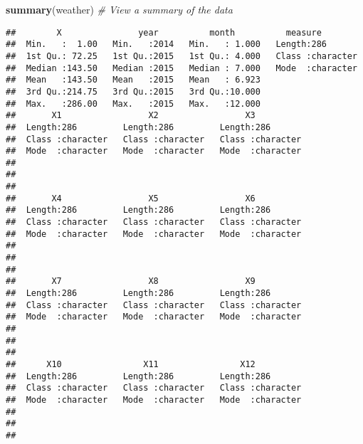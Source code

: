 \documentclass[]{article}
\newenvironment{Shaded}{\begin{snugshade}}{\end{snugshade}}
\newcommand{\KeywordTok}[1]{\textcolor[rgb]{0.13,0.29,0.53}{\textbf{#1}}}
\newcommand{\CommentTok}[1]{\textcolor[rgb]{0.56,0.35,0.01}{\textit{#1}}}
\newcommand{\NormalTok}[1]{#1}
\begin{document}
\begin{Shaded}
\begin{Highlighting}[]
\KeywordTok{summary}\NormalTok{(weather) }\CommentTok{# View a summary of the data}
\end{Highlighting}
\end{Shaded}

\begin{verbatim}
##        X               year          month          measure         
##  Min.   :  1.00   Min.   :2014   Min.   : 1.000   Length:286        
##  1st Qu.: 72.25   1st Qu.:2015   1st Qu.: 4.000   Class :character  
##  Median :143.50   Median :2015   Median : 7.000   Mode  :character  
##  Mean   :143.50   Mean   :2015   Mean   : 6.923                     
##  3rd Qu.:214.75   3rd Qu.:2015   3rd Qu.:10.000                     
##  Max.   :286.00   Max.   :2015   Max.   :12.000                     
##       X1                 X2                 X3           
##  Length:286         Length:286         Length:286        
##  Class :character   Class :character   Class :character  
##  Mode  :character   Mode  :character   Mode  :character  
##                                                          
##                                                          
##                                                          
##       X4                 X5                 X6           
##  Length:286         Length:286         Length:286        
##  Class :character   Class :character   Class :character  
##  Mode  :character   Mode  :character   Mode  :character  
##                                                          
##                                                          
##                                                          
##       X7                 X8                 X9           
##  Length:286         Length:286         Length:286        
##  Class :character   Class :character   Class :character  
##  Mode  :character   Mode  :character   Mode  :character  
##                                                          
##                                                          
##                                                          
##      X10                X11                X12           
##  Length:286         Length:286         Length:286        
##  Class :character   Class :character   Class :character  
##  Mode  :character   Mode  :character   Mode  :character  
##                                                          
##                                                          
##                                                          

\end{verbatim}
\end{document}
